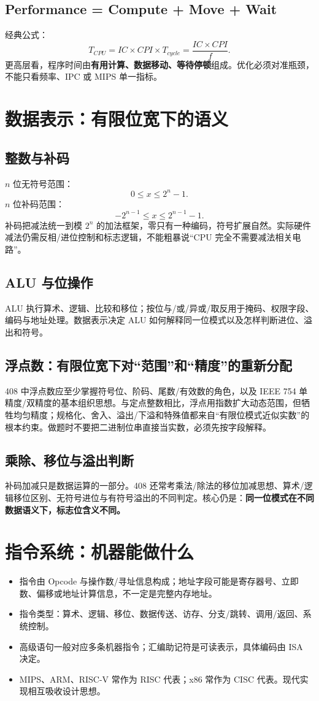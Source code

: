 \documentclass[11pt,a4paper,openany]{ctexbook}
\newcommand{\key}[1]{\textbf{\color{deep}#1}}
\begin{document}
\subsection{Performance = Compute + Move + Wait}
经典公式：
\[
T_{CPU}=IC\times CPI\times T_{cycle}=\frac{IC\times CPI}{f}.
\]
更高层看，程序时间由\key{有用计算、数据移动、等待停顿}组成。优化必须对准瓶颈，不能只看频率、IPC 或 MIPS 单一指标。

\section{数据表示：有限位宽下的语义}
\subsection{整数与补码}
$n$ 位无符号范围：
\[
0\le x\le 2^n-1.
\]
$n$ 位补码范围：
\[
-2^{n-1}\le x\le 2^{n-1}-1.
\]
补码把减法统一到模 $2^n$ 的加法框架，零只有一种编码，符号扩展自然。实际硬件减法仍需反相/进位控制和标志逻辑，不能粗暴说“CPU 完全不需要减法相关电路”。

\subsection{ALU 与位操作}
ALU 执行算术、逻辑、比较和移位；按位与/或/异或/取反用于掩码、权限字段、编码与地址处理。数据表示决定 ALU 如何解释同一位模式以及怎样判断进位、溢出和符号。


\subsection{浮点数：有限位宽下对“范围”和“精度”的重新分配}
408 中浮点数应至少掌握符号位、阶码、尾数/有效数的角色，以及 IEEE 754 单精度/双精度的基本组织思想。与定点整数相比，浮点用指数扩大动态范围，但牺牲均匀精度；规格化、舍入、溢出/下溢和特殊值都来自“有限位模式近似实数”的根本约束。做题时不要把二进制位串直接当实数，必须先按字段解释。

\subsection{乘除、移位与溢出判断}
补码加减只是数据运算的一部分。408 还常考乘法/除法的移位加减思想、算术/逻辑移位区别、无符号进位与有符号溢出的不同判定。核心仍是：\textbf{同一位模式在不同数据语义下，标志位含义不同。}

\section{指令系统：机器能做什么}
\begin{itemize}
  \item 指令由 Opcode 与操作数/寻址信息构成；地址字段可能是寄存器号、立即数、偏移或地址计算信息，不一定是完整内存地址。
  \item 指令类型：算术、逻辑、移位、数据传送、访存、分支/跳转、调用/返回、系统控制。
  \item 高级语句一般对应多条机器指令；汇编助记符是可读表示，具体编码由 ISA 决定。
  \item MIPS、ARM、RISC-V 常作为 RISC 代表；x86 常作为 CISC 代表。现代实现相互吸收设计思想。
\end{itemize}
\end{document}
